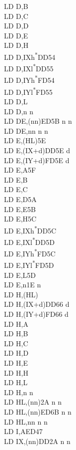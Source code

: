 \documentclass[oneside,a4paper]{book}
\begin{document}
\begin{multicols}{3}
{\begin{tabbing}
LD D,B\\
LD D,C\\
LD D,D\\
LD D,E\\
LD D,H\\
LD D,IXh\textsuperscript{*}\>DD54\\
LD D,IXl\textsuperscript{*}\>DD55\\
LD D,IYh\textsuperscript{*}\>FD54\\
LD D,IYl\textsuperscript{*}\>FD55\\
LD D,L\\
LD D,n n\\
LD DE,(nn)\>ED5B n n\\
LD DE,nn n n\\
LD E,(HL)\>5E\\
LD E,(IX+d)\>DD5E d\\
LD E,(IY+d)\>FD5E d\\
LD E,A\>5F\\
LD E,B\\
LD E,C\\
LD E,D\>5A\\
LD E,E\>5B\\
LD E,H\>5C\\
LD E,IXh\textsuperscript{*}\>DD5C\\
LD E,IXl\textsuperscript{*}\>DD5D\\
LD E,IYh\textsuperscript{*}\>FD5C\\
LD E,IYl\textsuperscript{*}\>FD5D\\
LD E,L\>5D\\
LD E,n\>1E n\\
LD H,(HL)\\
LD H,(IX+d)\>DD66 d\\
LD H,(IY+d)\>FD66 d\\
LD H,A\\
LD H,B\\
LD H,C\\
LD H,D\\
LD H,E\\
LD H,H\\
LD H,L\\
LD H,n n\\
LD HL,(nn)\>2A n n\\
LD HL,(nn)\>ED6B n n\\
LD HL,nn n n\\
LD I,A\>ED47\\
LD IX,(nn)\>DD2A n n\\

\end{tabbing}}
\end{multicols}
\end{document}
